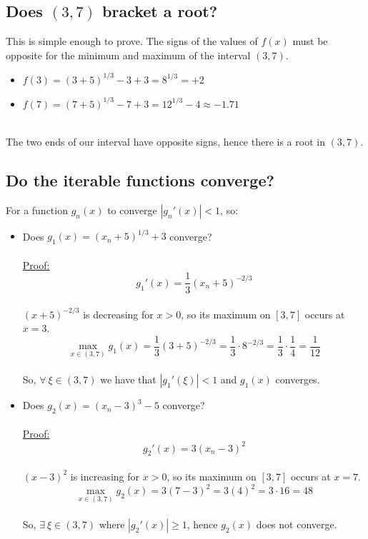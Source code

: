 \documentclass[../main.tex]{subfiles}
\begin{document}
    \subsection*{Does $(3,7)$ bracket a root?}\label{subsec:fixed-point-brackets-root}
    This is simple enough to prove.
    The signs of the values of $f(x)$ must be opposite for the minimum and maximum of the interval $(3,7)$.
    \begin{itemize}
        \item $f(3) = (3 + 5)^{1/3} - 3 + 3 = 8^{1/3} = +2$
        \item $f(7) = (7 + 5)^{1/3} - 7 + 3 = 12^{1/3} - 4 \approx -1.71$
    \end{itemize}\\
    The two ends of our interval have opposite signs, hence there is a root in $(3,7)$.

    \subsection*{Do the iterable functions converge?}\label{subsec:fixed-point-iterables-convergence}
    For a function $g_{n}(x)$ to converge $|g_{n}'(x)| < 1$, so:
    \begin{itemize}
        \item Does $g_{1}(x) = (x_{n} + 5)^{1/3} + 3$ converge? \\
        \\ \underline{Proof:} \\
        \[g_{1}'(x) = \frac{1}{3}(x_{n} + 5)^{-2/3}\] \\
        $(x + 5)^{-2/3}$ is decreasing for $x > 0$, so its maximum on $[3,7]$ occurs at $x = 3$.
        \[\max_{x \in (3,7)} g_{1}(x) = \frac{1}{3}(3 + 5)^{-2/3} =
        \frac{1}{3} \cdot 8^{-2/3} = \frac{1}{3} \cdot \frac{1}{4} = \frac{1}{12}\] \\
        So, $\forall \ \xi \in (3,7)$ we have that $|g_{1}'(\xi)| < 1$ and $g_{1}(x)$ converges.

        \item Does $g_{2}(x) = (x_{n} - 3)^{3} - 5$ converge? \\
        \\ \underline{Proof:} \\
        \[g_{2}'(x) = 3(x_{n} - 3)^{2}\] \\
        $(x - 3)^{2}$ is increasing for $x > 0$, so its maximum on $[3,7]$ occurs at $x = 7$.
        \[\max_{x \in (3,7)} g_{2}(x) = 3(7 - 3)^{2} = 3(4)^{2} = 3 \cdot 16 = 48 \] \\
        So, $\exists \ \xi \in (3,7)$ where $|g_{2}'(x)| \geq 1$, hence $g_{2}(x)$ does not converge.
    \end{itemize}
\end{document}
